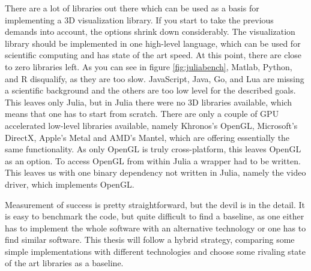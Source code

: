 There are a lot of libraries out there which can be used as a basis for implementing a 3D visualization library.
If you start to take the previous demands into account, the options shrink down considerably.
The visualization library should be implemented in one high-level language, which can be used for scientific computing and has state of the art speed. 
At this point, there are close to zero libraries left. As you can see in figure \ref{fig:juliabench}, Matlab, Python, and R disqualify, as they are too slow. JavaScript, Java, Go, and Lua are missing a scientific background and the others are too low level for the described goals.
This leaves only Julia, but in Julia there were no 3D libraries available, which means that one has to start from scratch.
There are only a couple of GPU accelerated low-level libraries available, namely Khronos's \ac{OpenGL}, Microsoft's DirectX, Apple's Metal and AMD's Mantel, which are offering essentially the same functionality. 
As only \ac{OpenGL} is truly cross-platform, this leaves \ac{OpenGL} as an option.
To access \ac{OpenGL} from within Julia a wrapper had to be written. 
This leaves us with one binary dependency not written in Julia, namely the video driver, which implements \ac{OpenGL}.

Measurement of success is pretty straightforward, but the devil is in the detail.
It is easy to benchmark the code, but quite difficult to find a baseline, as one either has to implement the whole software with an alternative technology or one has to find similar software.
This thesis will follow a hybrid strategy, comparing some simple implementations with different technologies and choose some rivaling state of the art libraries as a baseline.

